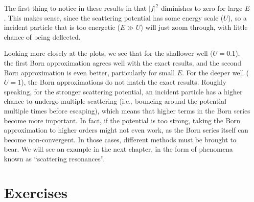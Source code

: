 \documentclass[pra,12pt]{revtex4-2}
\begin{document}
The first thing to notice in these results in that $|f|^2$ diminishes
to zero for large $E$.  This makes sense, since the scattering
potential has some energy scale ($U$), so a incident particle that is
too energetic ($E \gg U$) will just zoom through, with little chance
of being deflected.

Looking more closely at the plots, we see that for the shallower well
($U = 0.1$), the first Born approximation agrees well with the exact
results, and the second Born approximation is even better,
particularly for small $E$.  For the deeper well ($U = 1$), the Born
approximations do not match the exact results.  Roughly speaking, for
the stronger scattering potential, an incident particle has a higher
chance to undergo multiple-scattering (i.e., bouncing around the
potential multiple times before escaping), which means that higher
terms in the Born series become more important.  In fact, if the
potential is too strong, taking the Born approximation to higher
orders might not even work, as the Born series itself can become
non-convergent.  In those cases, different methods must be brought to
bear.  We will see an example in the next chapter, in the form of
phenomena known as ``scattering resonances''.

\section*{Exercises}
\end{document}
